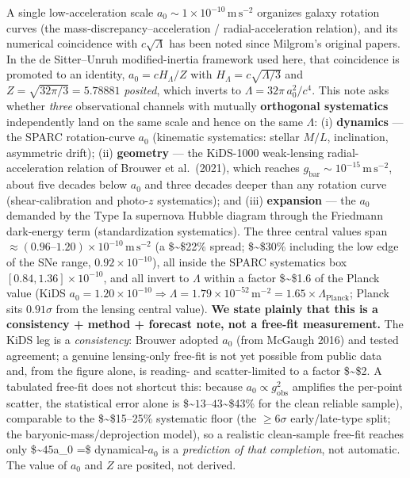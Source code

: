\documentclass[
]{article}
\begin{document}
A single low-acceleration scale
\(a_0 \sim 1\times10^{-10}\,\mathrm{m\,s^{-2}}\) organizes galaxy
rotation curves (the mass-discrepancy--acceleration /
radial-acceleration relation), and its numerical coincidence with
\(c\sqrt{\Lambda}\) has been noted since Milgrom's original papers. In
the de Sitter--Unruh modified-inertia framework used here, that
coincidence is promoted to an identity, \(a_0 = cH_\Lambda / Z\) with
\(H_\Lambda = c\sqrt{\Lambda/3}\) and \(Z=\sqrt{32\pi/3}=5.78881\)
\emph{posited}, which inverts to \(\Lambda = 32\pi\, a_0^2/c^4\). This
note asks whether \emph{three} observational channels with mutually
\textbf{orthogonal systematics} independently land on the same scale and
hence on the same \(\Lambda\): (i) \textbf{dynamics} --- the SPARC
rotation-curve \(a_0\) (kinematic systematics: stellar \(M/L\),
inclination, asymmetric drift); (ii) \textbf{geometry} --- the KiDS-1000
weak-lensing radial-acceleration relation of Brouwer et al.~(2021),
which reaches \(g_\mathrm{bar}\!\sim\!10^{-15}\,\mathrm{m\,s^{-2}}\), about
five decades below \(a_0\) and three decades deeper than any rotation
curve (shear-calibration and photo-\(z\) systematics); and (iii)
\textbf{expansion} --- the \(a_0\) demanded by the Type Ia supernova
Hubble diagram through the Friedmann dark-energy term (standardization
systematics). The three central values span
\(\approx(0.96\text{–}1.20)\times10^{-10}\,\mathrm{m\,s^{-2}}\) (a
\$\sim\$22\% spread; \$\sim\$30\% including the low edge of the SNe
range, \(0.92\times10^{-10}\)), all inside the SPARC systematics box
\([0.84,1.36]\times10^{-10}\), and all invert to \(\Lambda\) within a
factor \$\sim\$1.6 of the Planck value (KiDS
\(a_0=1.20\times10^{-10}\Rightarrow\Lambda=1.79\times10^{-52}\,\mathrm{m^{-2}}=1.65\times\Lambda_\mathrm{Planck}\);
Planck sits \(0.91\sigma\) from the lensing central value). \textbf{We
state plainly that this is a consistency + method + forecast note, not a
free-fit measurement.} The KiDS leg is a \emph{consistency}: Brouwer
adopted \(a_0\) (from McGaugh 2016) and tested agreement; a genuine
lensing-only free-fit is not yet possible from public data and, from the
figure alone, is reading- and scatter-limited to a factor \$\sim\$2. A
tabulated free-fit does not shortcut this: because
\(a_0\propto g_\mathrm{obs}^2\) amplifies the per-point scatter, the
statistical error alone is \$\sim\(13–43%
\)\sim\$43\% for the clean reliable sample), comparable to the
\$\sim\$15--25\% systematic floor (the \(\ge6\sigma\) early/late-type
split; the baryonic-mass/deprojection model), so a realistic
clean-sample free-fit reaches only
\$\sim\(45%
\)a\_0 =\$ dynamical-\(a_0\) is a \emph{prediction of that completion},
not automatic. The value of \(a_0\) and \(Z\) are posited, not derived.
\end{document}
